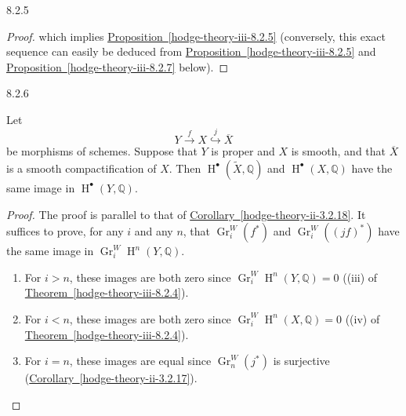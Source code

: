 \begin{proposition}{8.2.5}
\begin{proof}
      which implies \hyperref[hodge-theory-iii-8.2.5]{Proposition~\ref*{hodge-theory-iii-8.2.5}} (conversely, this exact sequence can easily be deduced from \hyperref[hodge-theory-iii-8.2.5]{Proposition~\ref*{hodge-theory-iii-8.2.5}} and \hyperref[hodge-theory-iii-8.2.7]{Proposition~\ref*{hodge-theory-iii-8.2.7}} below).\end{proof}\end{proposition}\begin{proposition}{8.2.6}\label{hodge-theory-iii-8.2.6}\skipsinglepar\par{}Let
    \[       Y       \xrightarrow {f} X       \overset {j}{\hookrightarrow } \overline {X}     \]
    be morphisms of schemes.
    Suppose that \(Y\) is proper and \(X\) is smooth, and that \(\overline {X}\) is a smooth compactification of \(X\).
    Then \(\operatorname {H}^\bullet (\widetilde {X},\mathbb {Q})\) and \(\operatorname {H}^\bullet (X,\mathbb {Q})\) have the same image in \(\operatorname {H}^\bullet (Y,\mathbb {Q})\).\begin{proof}\par{}The proof is parallel to that of \hyperref[hodge-theory-ii-3.2.18]{Corollary~\ref*{hodge-theory-ii-3.2.18}}.
      It suffices to prove, for any \(i\) and any \(n\), that \(\operatorname {Gr}_i^W(f^*)\) and \(\operatorname {Gr}_i^W((jf)^*)\) have the same image in \(\operatorname {Gr}_i^W\operatorname {H}^n(Y,\mathbb {Q})\).

      
 \begin{enumerate}
        
 \item[(a)]
          For \(i>n\), these images are both zero since \(\operatorname {Gr}_i^W\operatorname {H}^n(Y,\mathbb {Q})=0\) ((iii) of \hyperref[hodge-theory-iii-8.2.4]{Theorem~\ref*{hodge-theory-iii-8.2.4}}).
        

        
 \item[(b)]
          For \(i<n\), these images are both zero since \(\operatorname {Gr}_i^W\operatorname {H}^n(X,\mathbb {Q})=0\) ((iv) of \hyperref[hodge-theory-iii-8.2.4]{Theorem~\ref*{hodge-theory-iii-8.2.4}}).
        

        
 \item[(c)]
          For \(i=n\), these images are equal since \(\operatorname {Gr}_n^W(j^*)\) is surjective (\hyperref[hodge-theory-ii-3.2.17]{Corollary~\ref*{hodge-theory-ii-3.2.17}}).
        


\end{enumerate}
\end{proof}
\end{proposition}
